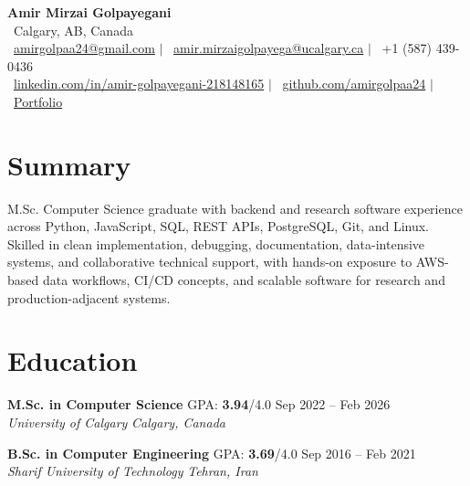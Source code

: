 \documentclass[a4paper,10pt]{article}
\newcommand{\resumeEducationSubheading}[5]{
    \textbf{#1} \hfill #2 \hfill #3 \\
    \textit{#4} \hfill \textit{#5}
}
\begin{document}

\begin{center}
    {\LARGE \textbf{Amir Mirzai Golpayegani}} \\[0.25em]
    \faMapMarker*~Calgary, AB, Canada \\[0.25em]
    \faEnvelope~\href{mailto:amirgolpaa24@gmail.com}{amirgolpaa24@gmail.com}
    $|$
    \faEnvelope~\href{mailto:amir.mirzaigolpayega@ucalgary.ca}{amir.mirzaigolpayega@ucalgary.ca}
    $|$
    \faPhone*~+1 (587) 439-0436 \\[0.25em]
    \faLinkedin~\href{https://linkedin.com/in/amir-golpayegani-218148165}{linkedin.com/in/amir-golpayegani-218148165}
    $|$
    \faGithub~\href{https://github.com/amirgolpaa24}{github.com/amirgolpaa24}
    $|$
    \faGlobe~\href{https://amir-portfolio-navy.vercel.app/}{Portfolio}
\end{center}


\section*{Summary}

M.Sc. Computer Science graduate with backend and research software experience across Python, JavaScript, SQL, REST APIs, PostgreSQL, Git, and Linux. Skilled in clean implementation, debugging, documentation, data-intensive systems, and collaborative technical support, with hands-on exposure to AWS-based data workflows, CI/CD concepts, and scalable software for research and production-adjacent systems.


\section*{Education}

\resumeEducationSubheading
{M.Sc. in Computer Science}
{GPA: \textbf{3.94}/4.0}
{Sep 2022 -- Feb 2026}
{University of Calgary}
{Calgary, Canada}

\vspace{0.35em}

\resumeEducationSubheading
{B.Sc. in Computer Engineering}
{GPA: \textbf{3.69}/4.0}
{Sep 2016 -- Feb 2021}
{Sharif University of Technology}
{Tehran, Iran}

\end{document}
